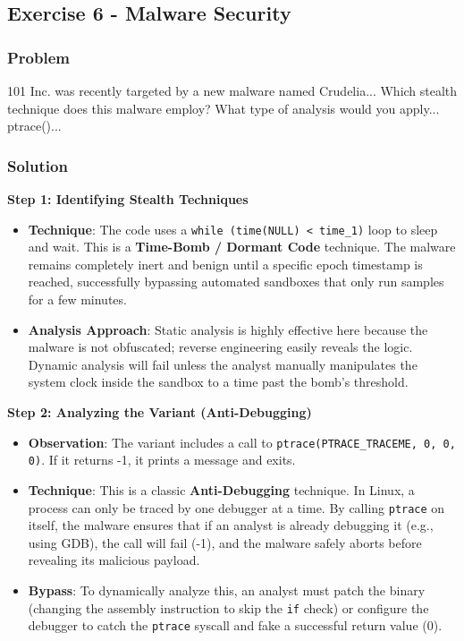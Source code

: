 \documentclass{article}
\begin{document}
\subsection{Exercise 6 - Malware Security}
\subsubsection*{Problem}
101 Inc. was recently targeted by a new malware named Crudelia... Which stealth technique does this malware employ? What type of analysis would you apply... ptrace()...

\subsubsection*{Solution}
\textbf{Step 1: Identifying Stealth Techniques}
\begin{itemize}
    \item \textbf{Technique}: The code uses a \texttt{while (time(NULL) < time\_1)} loop to sleep and wait. This is a \textbf{Time-Bomb / Dormant Code} technique. The malware remains completely inert and benign until a specific epoch timestamp is reached, successfully bypassing automated sandboxes that only run samples for a few minutes.
    \item \textbf{Analysis Approach}: Static analysis is highly effective here because the malware is not obfuscated; reverse engineering easily reveals the logic. Dynamic analysis will fail unless the analyst manually manipulates the system clock inside the sandbox to a time past the bomb's threshold.

\end{itemize}
\textbf{Step 2: Analyzing the Variant (Anti-Debugging)}
\begin{itemize}
    \item \textbf{Observation}: The variant includes a call to \texttt{ptrace(PTRACE\_TRACEME, 0, 0, 0)}. If it returns -1, it prints a message and exits.
    \item \textbf{Technique}: This is a classic \textbf{Anti-Debugging} technique. In Linux, a process can only be traced by one debugger at a time. By calling \texttt{ptrace} on itself, the malware ensures that if an analyst is already debugging it (e.g., using GDB), the call will fail (-1), and the malware safely aborts before revealing its malicious payload.
    \item \textbf{Bypass}: To dynamically analyze this, an analyst must patch the binary (changing the assembly instruction to skip the \texttt{if} check) or configure the debugger to catch the \texttt{ptrace} syscall and fake a successful return value (0).
\end{itemize}
\end{document}
